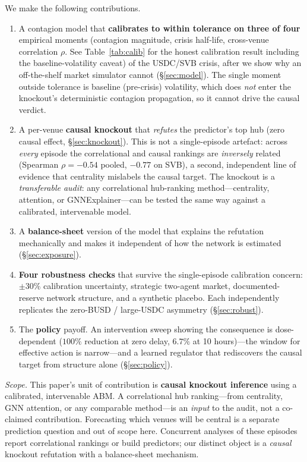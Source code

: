 \documentclass[sigconf,anonymous]{acmart}
\begin{document}
We make the following contributions.
\begin{enumerate}
\item A contagion model that \textbf{calibrates to within tolerance on three of four} empirical moments (contagion magnitude, crisis half-life, cross-venue correlation $\rho$. See Table~\ref{tab:calib} for the honest calibration result including the baseline-volatility caveat)
of the USDC/SVB crisis, after we show why an off-the-shelf market simulator cannot (\S\ref{sec:model}).
The single moment outside tolerance is baseline (pre-crisis) volatility, which does \emph{not}
enter the knockout's deterministic contagion propagation, so it cannot drive the causal verdict.
\item A per-venue \textbf{causal knockout} that \emph{refutes} the predictor's top hub (zero causal
effect, \S\ref{sec:knockout}). This is not a single-episode artefact: across \emph{every} episode
the correlational and causal rankings are \emph{inversely} related (Spearman $\rho=-0.54$ pooled,
$-0.77$ on SVB), a second, independent line of evidence that centrality mislabels the causal target.
The knockout is a \emph{transferable audit}: any correlational
hub-ranking method---centrality, attention, or GNNExplainer---can be tested the same way against a
calibrated, intervenable model.
\item A \textbf{balance-sheet} version of the model that explains the refutation mechanically and
makes it independent of how the network is estimated (\S\ref{sec:exposure}).
\item \textbf{Four robustness checks} that survive the single-episode calibration concern:
$\pm30\%$ calibration uncertainty, strategic two-agent market, documented-reserve network structure,
and a synthetic placebo. Each independently replicates the zero-BUSD / large-USDC asymmetry (\S\ref{sec:robust}).
\item The \textbf{policy} payoff. An intervention sweep showing the consequence is dose-dependent
($100\%$ reduction at zero delay, $6.7\%$ at 10 hours)---the window for effective action is narrow---and
a learned regulator that rediscovers the causal target from structure alone (\S\ref{sec:policy}).
\end{enumerate}

\noindent\textit{Scope.} This paper's unit of contribution is \textbf{causal knockout inference}
using a calibrated, intervenable ABM. A correlational hub ranking---from centrality, GNN
attention, or any comparable method---is an \emph{input} to the audit, not a co-claimed contribution.
Forecasting which venues will be central is a separate prediction question and out of scope here.
Concurrent analyses of these episodes report correlational rankings or build predictors; our
distinct object is a \emph{causal} knockout refutation with a balance-sheet mechanism.
\end{document}
